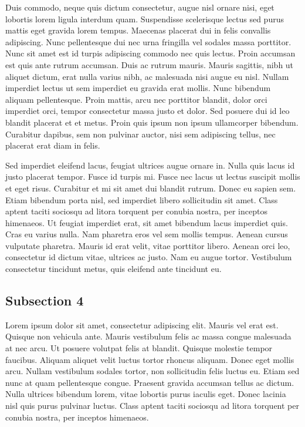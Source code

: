 Duis commodo, neque quis dictum consectetur, augue nisl ornare nisi, eget lobortis lorem ligula interdum quam.
Suspendisse scelerisque lectus sed purus mattis eget gravida lorem tempus. Maecenas placerat dui in felis convallis
adipiscing. Nunc pellentesque dui nec urna fringilla vel sodales massa porttitor. Nunc sit amet est id turpis adipiscing
commodo nec quis lectus. Proin accumsan est quis ante rutrum accumsan. Duis ac rutrum mauris. Mauris sagittis, nibh ut
aliquet dictum, erat nulla varius nibh, ac malesuada nisi augue eu nisl. Nullam imperdiet lectus ut sem imperdiet eu
gravida erat mollis. Nunc bibendum aliquam pellentesque. Proin mattis, arcu nec porttitor blandit, dolor orci imperdiet
orci, tempor consectetur massa justo et dolor. Sed posuere dui id leo blandit placerat et et metus. Proin quis ipsum non
ipsum ullamcorper bibendum. Curabitur dapibus, sem non pulvinar auctor, nisi sem adipiscing tellus, nec placerat erat
diam in felis.

Sed imperdiet eleifend lacus, feugiat ultrices augue ornare in. Nulla quis lacus id justo placerat tempor. Fusce id
turpis mi. Fusce nec lacus ut lectus suscipit mollis et eget risus. Curabitur et mi sit amet dui blandit rutrum. Donec
eu sapien sem. Etiam bibendum porta nisl, sed imperdiet libero sollicitudin sit amet. Class aptent taciti sociosqu ad
litora torquent per conubia nostra, per inceptos himenaeos. Ut feugiat imperdiet erat, sit amet bibendum lacus imperdiet
quis. Cras eu varius nulla. Nam pharetra eros vel sem mollis tempus. Aenean cursus vulputate pharetra. Mauris id erat
velit, vitae porttitor libero. Aenean orci leo, consectetur id dictum vitae, ultrices ac justo. Nam eu augue tortor.
Vestibulum consectetur tincidunt metus, quis eleifend ante tincidunt eu.

\subsection{Subsection 4}

Lorem ipsum dolor sit amet, consectetur adipiscing elit. Mauris vel erat est. Quisque non vehicula ante. Mauris
vestibulum felis ac massa congue malesuada at nec arcu. Ut posuere volutpat felis at blandit. Quisque molestie tempor
faucibus. Aliquam aliquet velit luctus tortor rhoncus aliquam. Donec eget mollis arcu. Nullam vestibulum sodales tortor,
non sollicitudin felis luctus eu. Etiam sed nunc at quam pellentesque congue. Praesent gravida accumsan tellus ac
dictum. Nulla ultrices bibendum lorem, vitae lobortis purus iaculis eget. Donec lacinia nisl quis purus pulvinar luctus.
Class aptent taciti sociosqu ad litora torquent per conubia nostra, per inceptos himenaeos.

